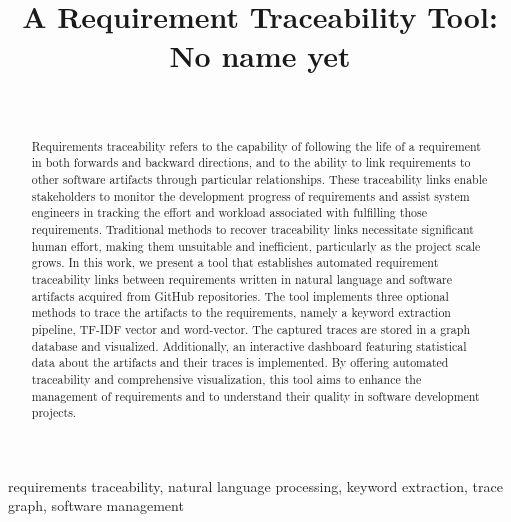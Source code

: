 \documentclass[conference]{IEEEtran}
\begin{document}
\title{A Requirement Traceability Tool: No name yet}

\author{
  \\
}


\maketitle
\begin{abstract}
 Requirements traceability refers to the capability of following the life of a requirement in both forwards and backward directions, and to the ability to link requirements to other software artifacts through particular relationships.
These traceability links enable stakeholders to monitor the development progress of requirements and assist system engineers in tracking the effort and workload associated with fulfilling those requirements.
Traditional methods to recover traceability links necessitate significant human effort, making them unsuitable and inefficient, particularly as the project scale grows.
In this work, we present a tool that establishes automated requirement traceability links between requirements written in natural language and software artifacts acquired from GitHub repositories. The tool implements three optional methods to trace the artifacts to the requirements, namely a keyword extraction pipeline, TF-IDF vector and word-vector. The captured traces are stored in a graph database and visualized. Additionally, an interactive dashboard featuring statistical data about the artifacts and their traces is implemented. By offering automated traceability and comprehensive visualization, this tool aims to enhance the management of requirements and to understand their quality in software development projects.

\end{abstract}
\begin{IEEEkeywords}
requirements traceability, natural language processing,  keyword extraction, trace graph, software management
\end{IEEEkeywords}



















\end{document}
